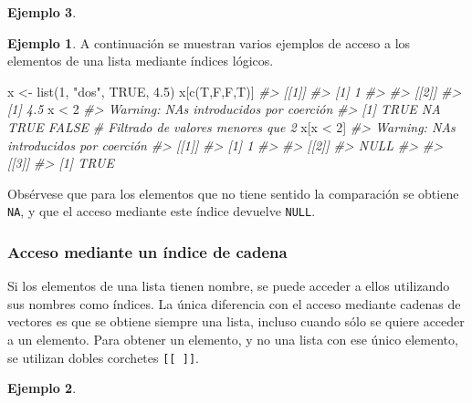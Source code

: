 \documentclass[
]{book}
\newenvironment{Shaded}{\begin{snugshade}}{\end{snugshade}}
\newcommand{\CommentTok}[1]{\textcolor[rgb]{0.56,0.35,0.01}{\textit{#1}}}
\newcommand{\ConstantTok}[1]{\textcolor[rgb]{0.00,0.00,0.00}{#1}}
\newcommand{\DecValTok}[1]{\textcolor[rgb]{0.00,0.00,0.81}{#1}}
\newcommand{\FloatTok}[1]{\textcolor[rgb]{0.00,0.00,0.81}{#1}}
\newcommand{\FunctionTok}[1]{\textcolor[rgb]{0.00,0.00,0.00}{#1}}
\newcommand{\NormalTok}[1]{#1}
\newcommand{\OtherTok}[1]{\textcolor[rgb]{0.56,0.35,0.01}{#1}}
\newcommand{\SpecialCharTok}[1]{\textcolor[rgb]{0.00,0.00,0.00}{#1}}
\newcommand{\StringTok}[1]{\textcolor[rgb]{0.31,0.60,0.02}{#1}}
\theoremstyle{definition}
\theoremstyle{definition}
\newtheorem{example}{Ejemplo}[chapter]
\theoremstyle{definition}
\theoremstyle{definition}
\theoremstyle{remark}
\begin{document}
\begin{example}
\begin{example}
A continuación se muestran varios ejemplos de acceso a los elementos de una lista mediante índices lógicos.

\begin{Shaded}
\begin{Highlighting}[]
\NormalTok{x }\OtherTok{\textless{}{-}} \FunctionTok{list}\NormalTok{(}\DecValTok{1}\NormalTok{, }\StringTok{"dos"}\NormalTok{, }\ConstantTok{TRUE}\NormalTok{, }\FloatTok{4.5}\NormalTok{)}
\NormalTok{x[}\FunctionTok{c}\NormalTok{(T,F,F,T)]}
\CommentTok{\#\textgreater{} [[1]]}
\CommentTok{\#\textgreater{} [1] 1}
\CommentTok{\#\textgreater{} }
\CommentTok{\#\textgreater{} [[2]]}
\CommentTok{\#\textgreater{} [1] 4.5}
\NormalTok{x }\SpecialCharTok{\textless{}} \DecValTok{2}
\CommentTok{\#\textgreater{} Warning: NAs introducidos por coerción}
\CommentTok{\#\textgreater{} [1]  TRUE    NA  TRUE FALSE}
\CommentTok{\# Filtrado de valores menores que 2}
\NormalTok{x[x }\SpecialCharTok{\textless{}} \DecValTok{2}\NormalTok{]}
\CommentTok{\#\textgreater{} Warning: NAs introducidos por coerción}
\CommentTok{\#\textgreater{} [[1]]}
\CommentTok{\#\textgreater{} [1] 1}
\CommentTok{\#\textgreater{} }
\CommentTok{\#\textgreater{} [[2]]}
\CommentTok{\#\textgreater{} NULL}
\CommentTok{\#\textgreater{} }
\CommentTok{\#\textgreater{} [[3]]}
\CommentTok{\#\textgreater{} [1] TRUE}
\end{Highlighting}
\end{Shaded}

Obsérvese que para los elementos que no tiene sentido la comparación se obtiene \texttt{NA}, y que el acceso mediante este índice devuelve \texttt{NULL}.
\end{example}

\hypertarget{acceso-mediante-un-uxedndice-de-cadena-1}{%
\subsubsection{Acceso mediante un índice de cadena}\label{acceso-mediante-un-uxedndice-de-cadena-1}}

Si los elementos de una lista tienen nombre, se puede acceder a ellos utilizando sus nombres como índices. La única diferencia con el acceso mediante cadenas de vectores es que se obtiene siempre una lista, incluso cuando sólo se quiere acceder a un elemento. Para obtener un elemento, y no una lista con ese único elemento, se utilizan dobles corchetes \texttt{{[}{[}\ {]}{]}}.

\begin{example}


\end{example}
\end{example}
\end{document}
